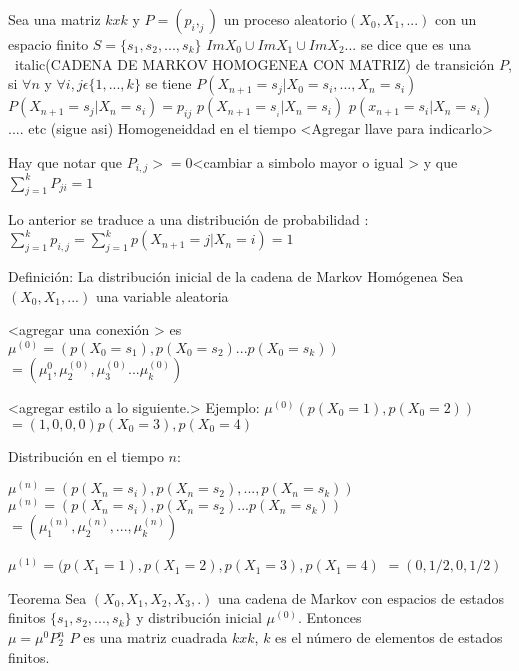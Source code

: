Sea una matriz $k x k$ y $P = (p_i,_j)$ un proceso aleatorio$(X_0,X_1,...)$ con un espacio finito $S = \{s_1,s_2,...,s_k\}$ $ Im X_0 \cup Im X_1 \cup ImX_2$... se dice que es una ~italic(CADENA DE MARKOV HOMOGENEA CON MATRIZ) de transici\'on $P$, si $\forall n$ y $\forall i,j \epsilon \{1,...,k\} $ se tiene $P(X_{n +1} = s_j | X_0 = s_i,..., X_n = s_i)$\\


$ P (X_{n+1} = s_j | X_n = s_i) = p_{ij}$
$p(X_{n + 1} = s_{_i} |X_n = s_i )$
$p(x_{n+1} = s_i | X _n = s_i) $
.... etc (sigue asi)
Homogeneiddad en el tiempo
<Agregar llave  para indicarlo>

Hay que notar que $P_{i,j} >= 0$<cambiar a simbolo mayor o igual > y que $\sum_{j=1}^{k}P_{ji} = 1$

Lo anterior se traduce a una  distribuci\'on de probabilidad :
$\sum_{j = 1}^{k}p_{i,j} = \sum_{j = 1}^k p(X_{n +1} = j | X_n = i) = 1$

 Definici\'on: La distribuci\'on inicial  de la cadena de Markov Hom\'ogenea
Sea  $(X_0,X_1,...) $ una variable aleatoria

<agregar una conexi\'on >
es
$\mu^{(0)} = (p(X_0 = s_1), p(X_0 = s_2) ...p(X_0 = s_k))$
$ = ( \mu_1^0, \mu_2^{(0)},\mu_3^{(0)} ... \mu_k^{(0)})  $

<agregar estilo a lo siguiente.>
Ejemplo: $\mu^{(0)} (p(X_0 = 1), p(X_0 = 2)) $
$= (1, 0, 0, 0)p(X_0 = 3), p(X_0 = 4)$

Distribuci\'on en el tiempo $n$:

$\mu^{(n)} = (p(X_n = s_i), p(X_n = s_2), ..., p(X_n = s_k))$
$\mu^{(n)} = (p(X_n = s_i),p(X_n = s_2) ... p(X_n = s_k))$
$= (\mu_1^{(n)}, \mu_2^{(n)}, ..., \mu_k^{(n)} )$





$\mu^{(1)} = (p(X_1 = 1), p(X_1 = 2), p(X_1 = 3), p(X_1 = 4)$
$ = (0,  1/2, 0, 1/2) $

Teorema
 Sea $(X_0, X_1, X_2, X_3,  . )$
  una cadena de Markov con espacios de estados finitos $\{s_1,s_2,...,s_k\}$  y distribuci\'on inicial $\mu^{(0)}$. Entonces\\

$\mu = \mu^{0}P^n_2 $
$P$  es una matriz cuadrada   $k  xk $, $k$ es el n\'umero de elementos de estados finitos.\\



